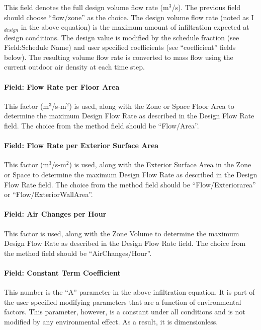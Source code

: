 This field denotes the full design volume flow rate (m\(^{3}\)/s). The previous field should choose ``flow/zone'' as the choice. The design volume flow rate (noted as I\(_{design}\) in the above equation) is the maximum amount of infiltration expected at design conditions. The design value is modified by the schedule fraction (see Field:Schedule Name) and user specified coefficients (see ``coefficient'' fields below). The resulting volume flow rate is converted to mass flow using the current outdoor air density at each time step.

\paragraph{Field: Flow Rate per Floor Area}\label{field-flow-per-zone-floor-area}

This factor (m\(^{3}\)/s-m\(^{2}\)) is used, along with the Zone or Space Floor Area to determine the maximum Design Flow Rate as described in the Design Flow Rate field. The choice from the method field should be ``Flow/Area''.

\paragraph{Field: Flow Rate per Exterior Surface Area}\label{field-flow-per-exterior-surface-area}

This factor (m\(^{3}\)/s-m\(^{2}\)) is used, along with the Exterior Surface Area in the Zone or Space to determine the maximum Design Flow Rate as described in the Design Flow Rate field. The choice from the method field should be ``Flow/Exteriorarea'' or ``Flow/ExteriorWallArea''.

\paragraph{Field: Air Changes per Hour}\label{field-air-changes-per-hour}

This factor is used, along with the Zone Volume to determine the maximum Design Flow Rate as described in the Design Flow Rate field. The choice from the method field should be ``AirChanges/Hour''.

\paragraph{Field: Constant Term Coefficient}\label{field-constant-term-coefficient}

This number is the ``A'' parameter in the above infiltration equation. It is part of the user specified modifying parameters that are a function of environmental factors. This parameter, however, is a constant under all conditions and is not modified by any environmental effect. As a result, it is dimensionless.

